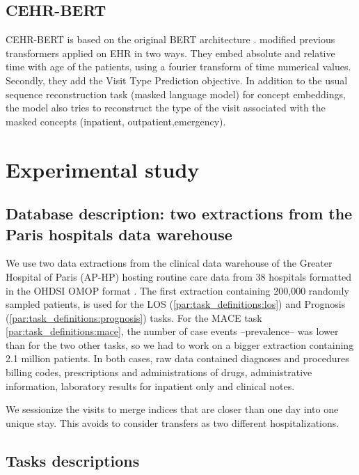 \documentclass[french,12pt,twoside,a4paper]{book}
\begin{document}
\begin{appendices}
  \subsection{CEHR-BERT}\label{apd:pipelines:cehr_bert}

  CEHR-BERT is based on the original BERT architecture \citep{devlin2018bert}.
  \cite{pang2021cehr} modified previous transformers applied on EHR in two ways.
  They embed absolute and relative time with age of the patients, using a fourier
  transform of time numerical values. Secondly, they add the Visit Type Prediction
  objective. In addition to the usual sequence reconstruction task (masked
  language model) for concept embeddings, the model also tries to reconstruct the
  type of the visit associated with the masked concepts (inpatient,
  outpatient,emergency).

  \section{Experimental study}\label{apd:predictive_models:experimental_study}

  \subsection{Database description: two extractions from the Paris hospitals data warehouse}%
  \label{apd:database_description}

  We use two data extractions from the clinical data warehouse of the Greater
  Hospital of Paris (AP-HP) hosting routine care data from 38 hospitals formatted
  in the OHDSI OMOP format \citep{hripcsak2015observational}. The first extraction
  containing 200,000 randomly sampled patients, is used for the LOS
  (\ref{par:task_definitions:los}) and Prognosis
  (\ref{par:task_definitions:prognosis}) tasks. For the MACE task
  \ref{par:task_definitions:mace}, the number of case events --prevalence-- was
  lower than for the two other tasks, so we had to work on a bigger extraction
  containing 2.1 million patients. In both cases, raw data contained diagnoses and
  procedures billing codes, prescriptions and administrations of drugs,
  administrative information, laboratory results for inpatient only and clinical
  notes.

  We sessionize the visits to merge indices that are closer than one day into one
  unique stay. This avoids to consider transfers as two different hospitalizations.

  \subsection{Tasks descriptions}\label{apd:tasks:population_selection}


\end{appendices}
\end{document}
